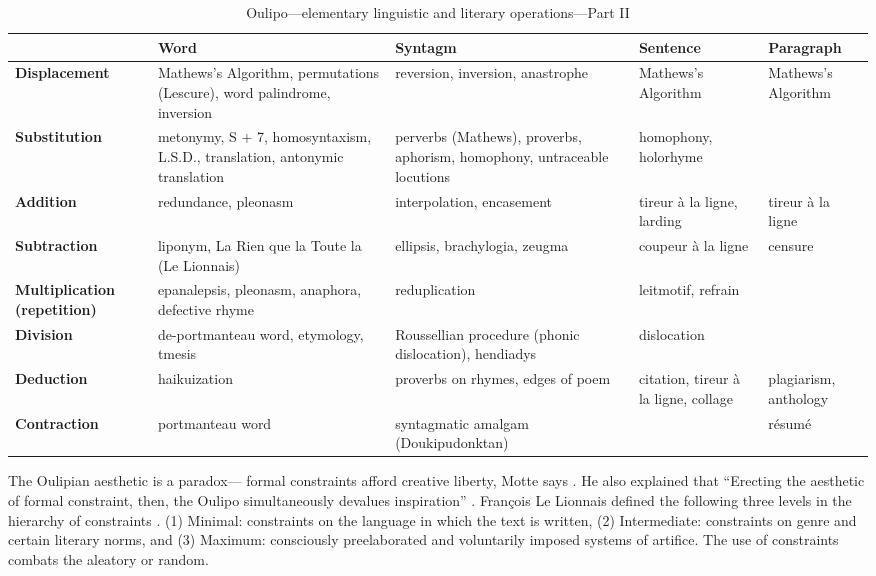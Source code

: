 \begin{table}[!htbp]
\caption[Oulipo operations II]{Oulipo---elementary linguistic and literary operations---Part II}
\label{tab:oulipo2}
{\footnotesize
\begin{tabu}{X[l,0.85]X[l,1.2]X[l,1.2]X[l,0.7]X[l,0.7]}
  \toprule
  & \textbf{Word}
  & \textbf{Syntagm}
  & \textbf{Sentence}
  & \textbf{Paragraph}
  \\ \midrule
  \textbf{Displacement} 
  & Mathews's Algorithm, permutations (Lescure), word palindrome, inversion
  & reversion, inversion, anastrophe
  & Mathews's Algorithm
  & Mathews's Algorithm
  \\
  \textbf{Substitution} 
  & metonymy, S + 7, homosyntaxism, L.S.D., translation, antonymic translation
  & perverbs (Mathews), proverbs, aphorism, homophony, untraceable locutions
  & homophony, holorhyme
  &
  \\
  \textbf{Addition} 
  & redundance, pleonasm
  & interpolation, encasement
  & tireur {\`a} la ligne, larding
  & tireur {\`a} la ligne
  \\
  \textbf{Subtraction} 
  & liponym, La Rien que la Toute la (Le Lionnais)
  & ellipsis, brachylogia, zeugma
  & coupeur {\`a} la ligne
  & censure
  \\
  \textbf{Multiplication (repetition)} 
  & epanalepsis, pleonasm, anaphora, defective rhyme
  & reduplication
  & leitmotif, refrain
  &
  \\
  \textbf{Division} 
  & de-portmanteau word, etymology, tmesis 
  & Roussellian procedure (phonic dislocation), hendiadys
  & dislocation
  &
  \\
  \textbf{Deduction} 
  & haikuization
  & proverbs on rhymes, edges of poem
  & citation, tireur {\`a} la ligne, collage
  & plagiarism, anthology
  \\
  \textbf{Contraction}
  & portmanteau word
  & syntagmatic amalgam (Doukipudonktan)
  &
  & r{\'e}sum{\'e}
  \\
  \bottomrule
\end{tabu}
}
\end{table}

The Oulipian aesthetic is a paradox--- formal constraints afford creative liberty, Motte says \citeyear[p.18]{Motte2007}. He also explained that ``Erecting the aesthetic of formal constraint, then, the Oulipo simultaneously devalues inspiration'' \autocite[p.10]{Motte2007}. François Le Lionnais defined the following three levels in the hierarchy of constraints \autocite[p.11]{Motte2007}. (1) Minimal: constraints on the language in which the text is written, (2) Intermediate: constraints on genre and certain literary norms, and (3) Maximum: consciously preelaborated and voluntarily imposed systems of artifice. The use of constraints combats the aleatory or random.

